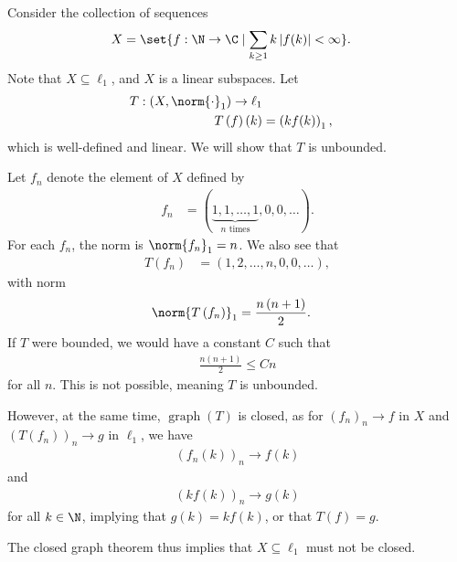 \documentclass[10pt]{mypackage}
\DeclareMathOperator{\Graph}{graph}
\begin{document}
  \begin{example}
    Consider the collection of sequences
    \begin{align*}
      X &= \set{f: \N\rightarrow\C\mid \sum_{k\geq 1}k\left\vert f(k) \right\vert < \infty}.
    \end{align*}
    Note that $X\subseteq \ell_1$, and $X$ is a linear subspaces. Let
    \begin{align*}
      T: \left(X,\norm{\cdot}_1\right) \rightarrow \ell_1\\
      T\left(f\right)\left(k\right) &= \left(kf(k)\right)_1,
    \end{align*}
    which is well-defined and linear. We will show that $T$ is unbounded.\newline

    Let $f_n$ denote the element of $X$ defined by
    \begin{align*}
      f_n &= (\underbrace{1,1,\dots,1}_{\text{$n$ times}},0,0,\dots).
    \end{align*}
    For each $f_n$, the norm is $\norm{f_n}_1 = n$. We also see that
    \begin{align*}
      T\left(f_n\right) &= \left(1,2,\dots,n,0,0,\dots\right),
    \end{align*}
    with norm
    \begin{align*}
      \norm{T\left(f_n\right)}_1 &= \frac{n\left(n+1\right)}{2}.
    \end{align*}
    If $T$ were bounded, we would have a constant $C$ such that
    \begin{align*}
      \frac{n\left(n+1\right)}{2}\leq Cn
    \end{align*}
    for all $n$. This is not possible, meaning $T$ is unbounded.\newline

    However, at the same time, $\Graph(T)$ is closed, as for $\left(f_n\right)_n\rightarrow f$ in $X$ and $\left(T\left(f_n\right)\right)_n\rightarrow g$ in $\ell_1$, we have
    \begin{align*}
      \left(f_n\left(k\right)\right)_n\rightarrow f(k)
    \end{align*}
    and
    \begin{align*}
      \left(kf(k)\right)_n\rightarrow g(k)
    \end{align*}
    for all $k\in \N$, implying that $g(k) = kf(k)$, or that $T\left(f\right) = g$.\newline

    The closed graph theorem thus implies that $X\subseteq \ell_1$ must not be closed.
  \end{example}
\end{document}
